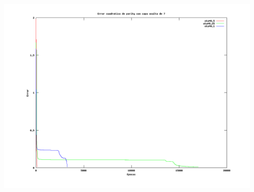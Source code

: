 \documentclass{article}
\begin{document}
\begin{center}
 \includegraphics[scale=0.35]{../../doc/results/cuadErrorparity_l7.png}
\end{center}
\end{document}
